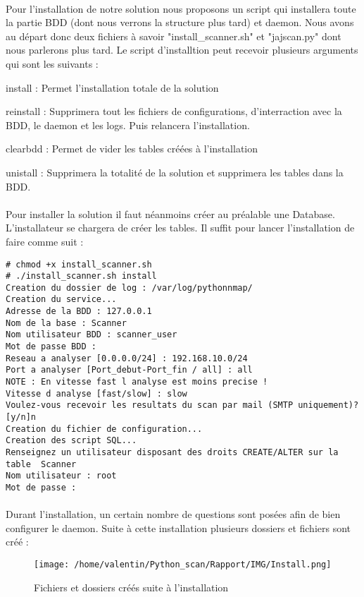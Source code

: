 \documentclass[12pt]{report}
\begin{document}
		\paragraph{}
			Pour l'installation de notre solution nous proposons un script qui installera toute la partie BDD (dont nous verrons la structure plus tard) et daemon. Nous avons au départ donc deux fichiers à savoir "install\_scanner.sh" et "jajscan.py" dont nous parlerons plus tard. Le script d'installtion peut recevoir plusieurs arguments qui sont les suivants :
			\begin{description}
				\item install : Permet l'installation totale de la solution
				\item reinstall : Supprimera tout les fichiers de configurations, d'interraction avec la BDD, le daemon et les logs. Puis relancera l'installation.
				\item clearbdd : Permet de vider les tables créées à l'installation
				\item unistall : Supprimera la totalité de la solution et supprimera les tables dans la BDD.
			\end{description}
		\paragraph{}
			Pour installer la solution il faut néanmoins créer au préalable une Database. L'installateur se chargera de créer les tables. Il suffit pour lancer l'installation de faire comme suit :
			\begin{lstlisting}[caption=Installation, captionpos=b]
# chmod +x install_scanner.sh 
# ./install_scanner.sh install
Creation du dossier de log : /var/log/pythonnmap/
Creation du service...
Adresse de la BDD : 127.0.0.1
Nom de la base : Scanner
Nom utilisateur BDD : scanner_user
Mot de passe BDD : 
Reseau a analyser [0.0.0.0/24] : 192.168.10.0/24
Port a analyser [Port_debut-Port_fin / all] : all
NOTE : En vitesse fast l analyse est moins precise !
Vitesse d analyse [fast/slow] : slow
Voulez-vous recevoir les resultats du scan par mail (SMTP uniquement)? [y/n]n
Creation du fichier de configuration...
Creation des script SQL...
Renseignez un utilisateur disposant des droits CREATE/ALTER sur la table  Scanner
Nom utilisateur : root
Mot de passe :
			\end{lstlisting}
		\paragraph{}
			Durant l'installation, un certain nombre de questions sont posées afin de bien configurer le daemon. Suite à cette installation plusieurs dossiers et fichiers sont créé :
			\begin{figure}[ht]
				\begin{center}\texttt{[image: /home/valentin/Python\_scan/Rapport/IMG/Install.png]}
				\caption{\label{create_file} Fichiers et dossiers créés suite à l'installation}\end{center}
			\end{figure}
\end{document}
